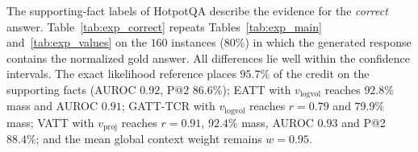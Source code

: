 The supporting-fact labels of HotpotQA describe the evidence for the \emph{correct} answer. Table~\ref{tab:exp_correct} repeats Tables~\ref{tab:exp_main} and~\ref{tab:exp_values} on the $160$ instances ($80\%$) in which the generated response contains the normalized gold answer. All differences lie well within the confidence intervals. The exact likelihood reference places $95.7\%$ of the credit on the supporting facts (AUROC $0.92$, P@2 $86.6\%$); EATT with $v_{\text{logvol}}$ reaches $92.8\%$ mass and AUROC $0.91$; GATT-TCR with $v_{\text{logvol}}$ reaches $r = 0.79$ and $79.9\%$ mass; VATT with $v_{\text{proj}}$ reaches $r = 0.91$, $92.4\%$ mass, AUROC $0.93$ and P@2 $88.4\%$; and the mean global context weight remains $w = 0.95$.

\begin{table}[t]
\centering
\small
\setlength{\tabcolsep}{2.6pt}
\end{table}
